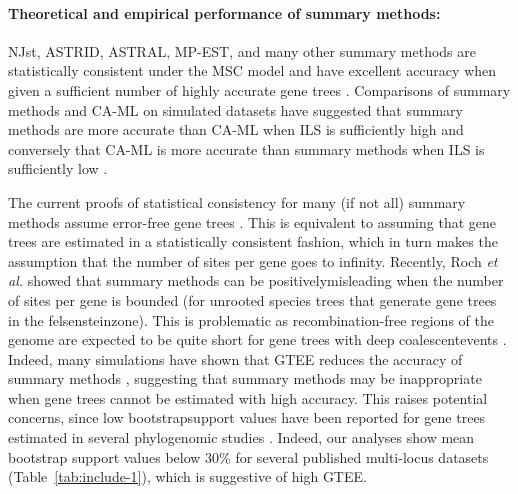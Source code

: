\paragraph{Theoretical and empirical performance of summary methods:}
NJst, ASTRID, ASTRAL, MP-EST, and many other summary methods are statistically consistent under the MSC model and have excellent accuracy when given a sufficient number of highly accurate gene trees \cite{liu2011estimating-njst, vachaspati2015astrid, mirarab2014astral, liu2010maximum-mpest, mirarab2015astral2}. 
Comparisons of summary methods and CA-ML on simulated datasets have suggested that summary methods are more accurate than CA-ML when ILS is sufficiently high and conversely that CA-ML is more accurate than summary methods when ILS is sufficiently low \cite{leache2010accuracy,bayzid2013naive, patel2013error, mirarab2014statistical-binning, bayzid2015weighted, chou2015comparative, mirarab2016evaluating}. 

The current proofs of statistical consistency for many (if not all) summary methods assume error-free gene trees \cite{roch2015robustness}.
This is equivalent to assuming that gene trees are estimated in a statistically consistent fashion, which in turn makes the assumption that the number of sites per gene goes to infinity.
Recently, Roch {\em et al.} \cite{roch2018long} showed that summary methods can be \gls{positivelymisleading} when the number of sites per gene is bounded (for unrooted species trees that generate gene trees in the \gls{felsensteinzone}).
This is problematic as \gls{recombination}-free regions of the genome are expected to be quite short for gene trees with deep \glspl{coalescentevent} \cite{springer2016gene}.
Indeed, many simulations have shown that GTEE reduces the accuracy of summary methods \cite{bayzid2013naive, mirarab2015astral2, patel2013error, mirarab2014statistical-binning, huang2010sources, degiorgio2014robustness, lanier2015applying, xi2015genes, meiklejohn2016analysis}, suggesting that summary methods may be inappropriate when gene trees cannot be estimated with high accuracy.
This raises potential concerns, since low \gls{bootstrapsupport} values have been reported for gene trees estimated in several \gls{phylogenomic} studies \cite{jarvis2014whole, wickett2014phylo}.
Indeed, our analyses show mean bootstrap support values below 30\% for several published multi-locus datasets (Table~\ref{tab:include-1}), which is suggestive of high GTEE.

